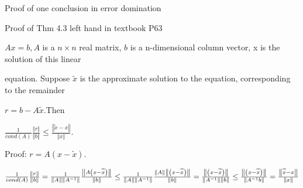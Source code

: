 \documentclass{article}
\begin{document}
Proof of one conclusion in error domination

Proof of Thm 4.3 left hand in textbook P63

$Ax=b,A$ is a $n\times n$ real matrix, $b$ is a n-dimensional column vector,
x is the solution of this linear

equation. Suppose $\widetilde{x}$ is the approximate solution to the
equation, corresponding to the remainder 

$r=b-A\widetilde{x}.$Then 

$\frac{1}{cond(A)}\frac{\left\Vert r\right\Vert }{\left\Vert b\right\Vert }%
\leq \frac{\left\Vert \widetilde{x}-x\right\Vert }{\left\Vert x\right\Vert }.
$

Proof: $r=A\left( x-\widetilde{x}\right) .$

$\frac{1}{cond(A)}\frac{\left\Vert r\right\Vert }{\left\Vert b\right\Vert }=%
\frac{1}{\left\Vert A\right\Vert \left\Vert A^{-1}\right\Vert }\frac{%
\left\Vert A\left( x-\widetilde{x}\right) \right\Vert }{\left\Vert
b\right\Vert }\leq \frac{1}{\left\Vert A\right\Vert \left\Vert
A^{-1}\right\Vert }\frac{\left\Vert A\right\Vert \left\Vert \left( x-%
\widetilde{x}\right) \right\Vert }{\left\Vert b\right\Vert }=\frac{%
\left\Vert \left( x-\widetilde{x}\right) \right\Vert }{\left\Vert
A^{-1}\right\Vert \left\Vert b\right\Vert }\leq \frac{\left\Vert \left( x-%
\widetilde{x}\right) \right\Vert }{\left\Vert A^{-1}b\right\Vert }=\frac{%
\left\Vert \widetilde{x}-x\right\Vert }{\left\Vert x\right\Vert }$
\end{document}
